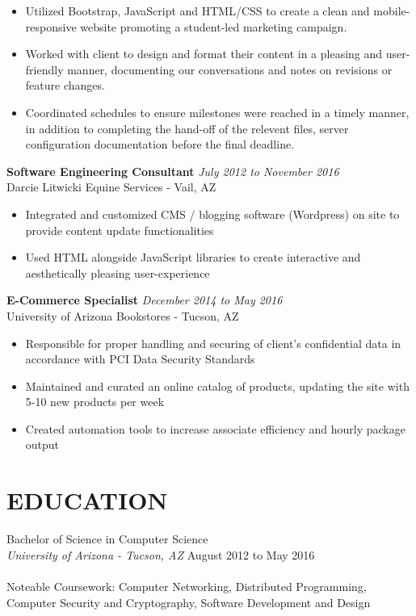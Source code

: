 \documentclass[10pt]{res} %
\begin{document}
\begin{resume}
   \begin{itemize} %
   \item Utilized Bootstrap, JavaScript and HTML/CSS to create a clean and mobile-responsive website promoting a student-led marketing campaign.
   \item Worked with client to design and format their content in a pleasing and user-friendly manner, documenting our conversations and notes on revisions or feature changes.
   \item Coordinated schedules to ensure milestones were reached in a timely manner, in addition to completing the hand-off of the relevent files, server configuration documentation before the final deadline.
   \end{itemize}

  {\bf Software Engineering Consultant} \hfill  {\sl July 2012 to November 2016}\\
  Darcie Litwicki Equine Services - Vail, AZ
  
   \begin{itemize} %
   \item Integrated and customized CMS / blogging software (Wordpress) on site to provide content update functionalities
   \item Used HTML alongside JavaScript libraries to create interactive and aesthetically pleasing user-experience
   \end{itemize}
   
   
  {\bf E-Commerce Specialist} \hfill  {\sl December 2014 to May 2016}\\
  University of Arizona Bookstores - Tucson, AZ
  
   \begin{itemize} %
   \item Responsible for proper handling and securing of client’s confidential data in accordance with PCI Data Security Standards
   \item Maintained and curated an online catalog of products, updating the site with 5-10 new products per week
   \item Created automation tools to increase associate efficiency and hourly package output
   \end{itemize}
 
\section{EDUCATION}
\vspace{4pt}
    Bachelor of Science in Computer Science \\
    {\sl University of Arizona - Tucson, AZ} \hfill    August 2012 to May 2016\\
    \\
    Noteable Coursework: Computer Networking, Distributed Programming, Computer Security and Cryptography, Software Development and Design
    

\end{resume}
\end{document}
